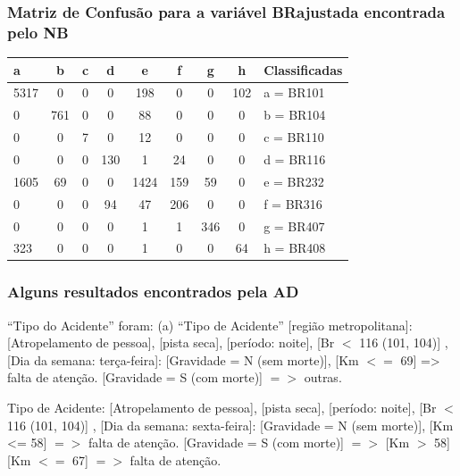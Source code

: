 \documentclass[11pt]{beamer}
\begin{document}
\begin{frame}\frametitle{Matriz de Confusão para a variável BRajustada encontrada pelo NB}
	\begin{table}[!ht]
		\centering
		\vspace{1mm}
		\begin{tabular}{l|c|c|c|c|c|c|c|l}
			\hline
			\textbf{a} & \textbf{b} & \textbf{c} & \textbf{d} & \textbf{e} & \textbf{f} & \textbf{g} & \textbf{h} & \textbf{Classificadas}\\
			\hline
			5317 &  0  &  0 &  0 & 198 & 0  & 0 & 102 & a = BR101\\
			0 & 761 &  0 &  0 & 88 &  0  & 0 &   0 & b = BR104\\
			0 &  0  &  7 &  0 & 12 &  0  & 0 &   0 &  c = BR110\\
			0 &   0 &  0 & 130 & 1 & 24  & 0 &   0 & d = BR116\\
			1605 &  69 &  0 &  0 & 1424 & 159 & 59 & 0 & e = BR232\\
			0 &   0 &  0 & 94 & 47 & 206 & 0 &   0 & f = BR316\\
			0 &   0 &  0 &  0 &  1 &  1 & 346 &  0 & g = BR407\\
			323 &   0 &  0 &  0 &  1 &  0 &  0 &  64 & h = BR408\\
		\end{tabular}
	\end{table}	
\end{frame}

\begin{frame}
	\frametitle{Alguns resultados encontrados pela AD}
“Tipo do Acidente” foram:
(a) “Tipo de Acidente” [região metropolitana]: [Atropelamento
de pessoa], [pista seca], [período: noite], [Br $<$ 116 (101, 104)]
, [Dia da semana: terça-feira]:
[Gravidade = N (sem morte)], [Km $<=$ 69] => falta de atenção.
[Gravidade = S (com morte)] $=>$ outras.

Tipo de Acidente: [Atropelamento de pessoa], [pista seca],
[período: noite], [Br $<$ 116 (101, 104)] , [Dia da semana: sexta-feira]:
[Gravidade = N (sem morte)], [Km <= 58] $=>$ falta de atenção.
[Gravidade = S (com morte)] $=>$ [Km $>$ 58] [Km $<=$ 67] $=>$
falta de atenção.
\end{frame}
\end{document}
